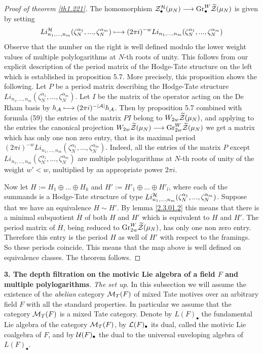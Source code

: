\documentclass[10pt]{article}
\begin{document}
\begin{proof}[Proof of theorem \ref{th1.221}] The homomorphism 
${\cal Z}_{\bullet}^{\cal H}(\mu_N) \longrightarrow {\rm Gr}^W_{\bullet}\widetilde {\cal Z}(\mu_N)$ 
 is given by setting
$$
Li^{\cal H}_{n_1, ..., n_m}(\zeta_N^{\alpha_1}, ..., \zeta_N^{\alpha_m}) \longmapsto 
(2\pi i)^{-w}Li_{n_1, ..., n_m}(\zeta_N^{\alpha_1}, ..., \zeta_N^{\alpha_m})
$$
Observe that the number on the right is well defined modulo the lower weight 
values of multiple polylogarithms at $N$-th roots of unity. 
This follows from our explicit description of the period matrix of the 
Hodge-Tate structure on the left which is established in proposition 5.7. 
More precisely, this proposition shows the following. Let $P$ be a period matrix 
describing the Hodge-Tate structure $Li_{n_1, ..., n_m}(\zeta_N^{\alpha_1}, ..., \zeta_N^{\alpha_m})$. Let $I$ be the matrix of the operator acting on the De Rham basis 
by $h_{\cal A} \longmapsto 
(2\pi i)^{-|{\cal A}|}h_{\cal A}$. Then by proposition 5.7 combined with formula (59) 
the  entries of the matrix 
$PI$ belong to $W_{2w}\widetilde {\cal Z}(\mu_N)$, and applying to 
the entries the canonical projection 
$W_{2w}\widetilde {\cal Z}(\mu_N) \longrightarrow {\rm Gr}^W_{2w}\widetilde {\cal Z}(\mu_N)$ we 
get a matrix which has only one non zero entry, that is its maximal period 
$(2\pi i)^{-w}Li_{n_1, ..., n_m}(\zeta_N^{\alpha_1}, ..., \zeta_N^{\alpha_m})$. Indeed, 
all the entries of the 
matrix $P$ except $Li_{n_1, ..., n_m}(\zeta_N^{\alpha_1}, ..., \zeta_N^{\alpha_m})$ are 
 multiple polylogarithms at $N$-th roots of unity of the weight $w' <w$, 
multiplied by an appropriate  power $2\pi i$. 

Now let $H:= H_1 \oplus ... \oplus H_k$ and  $H':= H'_1 \oplus ... \oplus H'_l$,
 where each of the summands is a Hodge-Tate structure of  type 
$Li^{\cal H}_{n_1, ..., n_m}(\zeta_N^{\alpha_1}, ..., \zeta_N^{\alpha_m})$. 
Suppose that we have an equivalence  $H \sim H'$. By 
 lemma \ref{2.3.01.2}  this means that there is a minimal subquotient $\overline H$ of both 
$H$ and $H'$  which is  equivalent to $H$ and $H'$. The period matrix of 
 $\overline H$, being reduced to 
${\rm Gr}^W_{2w}\widetilde {\cal Z}(\mu_N)$,  has only one non zero entry.  
Therefore this entry 
is the period $H$ as well of  $H'$ with respect to the framings.   
So these periods coincide. 
This means that
 the map above is well defined on equivalence classes.  The theorem follows. 


\end{proof}

{\bf 3. The depth filtration on the motivic Lie algebra of a field $F$ 
and multiple polylogarithms}. {\it The set up}. 
In this subsection we will 
assume the existence of the {\it abelian} category ${\cal M}_T(F)$ of mixed Tate motives over
 an arbitrary field $F$ with all the standard properties. In particular we assume 
that the category ${\cal M}_T(F)$ is a mixed Tate category. Denote by 
 $L(F)_{\bullet}$  the fundamental Lie algebra of the category ${\cal M}_T(F)$, by 
${\cal L}(F)_{\bullet}$ its dual, called the motivic Lie coalgebra of $F$, and by 
${\cal U}(F)_{\bullet}$ the dual to the universal enveloping algebra of $L(F)_{\bullet}$. 
\end{document}
